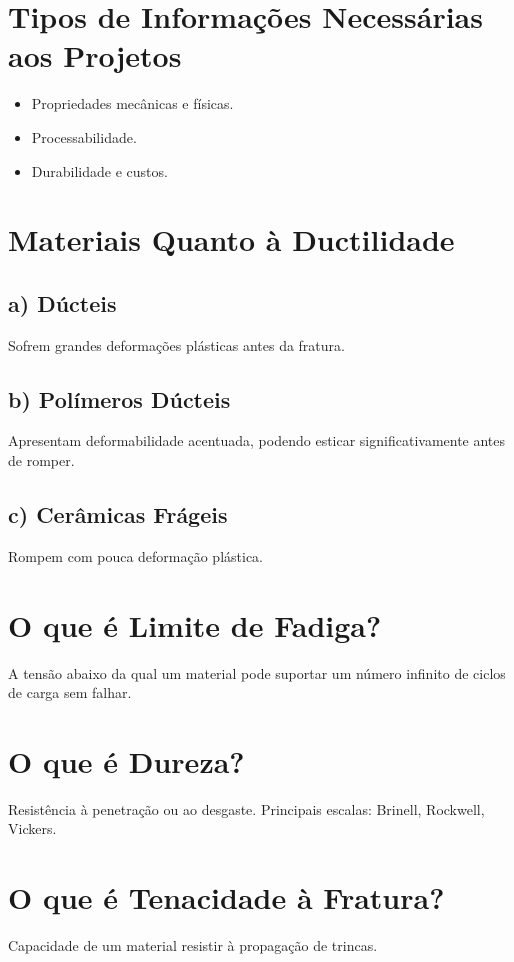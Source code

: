 \section{Tipos de Informações Necessárias aos Projetos}
\begin{itemize}
    \item Propriedades mecânicas e físicas.
    \item Processabilidade.
    \item Durabilidade e custos.
\end{itemize}

\section{Materiais Quanto à Ductilidade}
\subsection*{a) Dúcteis}
Sofrem grandes deformações plásticas antes da fratura.

\subsection*{b) Polímeros Dúcteis}
Apresentam deformabilidade acentuada, podendo esticar significativamente antes de romper.

\subsection*{c) Cerâmicas Frágeis}
Rompem com pouca deformação plástica.

\section{O que é Limite de Fadiga?}
A tensão abaixo da qual um material pode suportar um número infinito de ciclos de carga sem falhar.

\section{O que é Dureza?}
Resistência à penetração ou ao desgaste. Principais escalas: Brinell, Rockwell, Vickers.

\section{O que é Tenacidade à Fratura?}
Capacidade de um material resistir à propagação de trincas.

